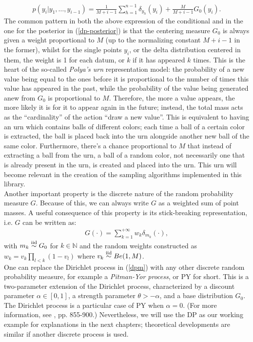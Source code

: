 \begin{equation}
	\begin{aligned}
		p(y_i|y_1,\dots,y_{i-1}) =
		\frac{1}{M+i-1}\sum_{h=1}^{n-1} \delta_{y_h}(y_i) + \frac{M}{M+i-1} G_0(y_i).
	\end{aligned}
\end{equation}
The common pattern in both the above expression of the conditional and in the one for the posterior in (\ref{dp-posterior}) is that the centering measure $G_0$ is always given a weight proportional to $M$ (up to the normalizing constant $M+i-1$ in the former), whilst for the single points $y_i$, or the delta distribution centered in them, the weight is 1 for each datum, or $k$ if it has appeared $k$ times.
This is the heart of the so-called \emph{Polya's urn} representation model: the probability of a new value being equal to the ones before it is proportional to the number of times this value has appeared in the past, while the probability of the value being generated anew from $G_0$ is proportional to $M$.
Therefore, the more a value appears, the more likely it is for it to appear again in the future; instead, the total mass acts as the  ``cardinality'' of the action ``draw a new value''.
This is equivalent to having an urn which contains balls of different colors; each time a ball of a certain color is extracted, the ball is placed back into the urn alongside another new ball of the same color.
Furthermore, there's a chance proportional to $M$ that instead of extracting a ball from the urn, a ball of a random color, not necessarily one that is already present in the urn, is created and placed into the urn.
This urn will become relevant in the creation of the sampling algorithms implemented in this library. 
\\
Another important property is the discrete nature of the random probability measure $G$.
Because of this, we can always write $G$ as a weighted sum of point masses.
A useful consequence of this property is its stick-breaking representation, i.e. $G$ can be written as:
\begin{align*}
	G(\cdot) = \sum_{k=1}^{+\infty} w_k \delta_{m_k} (\cdot),
\end{align*}
with $m_k \stackrel{\text{iid}}{\sim} G_0$ for $k\in\mathbb{N}$ and the random weights constructed as $w_k =v_k\prod\limits_{l<k} (1-v_l)$ where $v_k \stackrel{\text{iid}}{\sim} Be(1,M)$. \\

One can replace the Dirichlet process in (\ref{dpm}) with any other discrete random probability measure, for example a \emph{Pitman-Yor process}, or PY for short.
This is a two-parameter extension of the Dirichlet process, characterized by a discount parameter $\alpha \in [0,1]$, a strength parameter $\theta > - \alpha$, and a base distribution $G_0$.
The Dirichlet process is a particular case of PY when $\alpha=0$. (For more information, see \cite{PY}, pp. 855-900.)
Nevertheless, we will use the DP as our working example for explanations in the next chapters; theoretical developments are similar if another discrete process is used. \\

